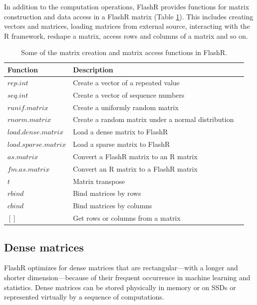 In addition to the computation operations, FlashR provides functions for matrix
construction and data access in a FlashR matrix (Table \ref{tbl:utility}). This
includes creating vectors and matrices, loading matrices from external source,
interacting with the R framework, reshape a matrix, access rows and columns of
a matrix and so on.

\begin{table}
\begin{center}
\footnotesize
\begin{tabular}{|l|l|l|}
\hline
Function & Description \\
\hline
$rep.int$ & Create a vector of a repeated value \\
$seq.int$ & Create a vector of sequence numbers \\
$runif.matrix$ & Create a uniformly random matrix  \\
$rnorm.matrix$ & Create a random matrix under a normal distribution \\
\hline
$load.dense.matrix$ & Load a dense matrix to FlashR \\
$load.sparse.matrix$ & Load a sparse matrix to FlashR \\
\hline
$as.matrix$ & Convert a FlashR matrix to an R matrix \\
$fm.as.matrix$ & Convert an R matrix to a FlashR matrix \\
\hline
$t$ & Matrix transpose \\
$rbind$ & Bind matrices by rows \\
$cbind$ & Bind matrices by columns \\
$[]$ & Get rows or columns from a matrix \\
\hline
\end{tabular}
\normalsize
\end{center}
\caption{Some of the matrix creation and matrix access functions in FlashR.}
\label{tbl:utility}
\end{table}

\subsection{Dense matrices}
FlashR optimizes for dense matrices that are rectangular---with
a longer and shorter dimension---because of their frequent occurrence
in machine learning and statistics. Dense matrices can be stored
physically in memory or on SSDs or represented virtually by a sequence of
computations.

